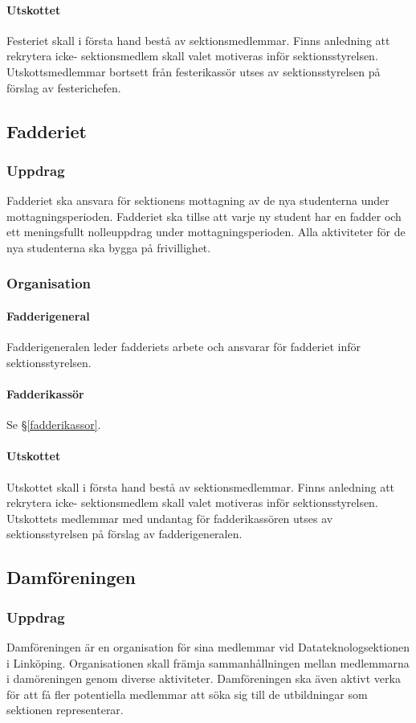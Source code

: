\documentclass{datateknologsektionen-document}
\begin{document}
\paragraph{Utskottet}
Festeriet skall i första hand bestå av sektionsmedlemmar. Finns anledning att rekrytera icke-
sektionsmedlem skall valet motiveras inför sektionsstyrelsen. Utskottsmedlemmar bortsett
från festerikassör utses av sektionsstyrelsen på förslag av festerichefen.
\subsection{Fadderiet}
\label{fadderiet}
\subsubsection{Uppdrag}
Fadderiet ska ansvara för sektionens mottagning av de nya studenterna under
mottagningsperioden. Fadderiet ska tillse att varje ny student har en fadder och ett meningsfullt
nolleuppdrag under mottagningsperioden. Alla aktiviteter för de nya studenterna ska bygga på
frivillighet.
\subsubsection{Organisation}
\paragraph{Fadderigeneral}
Fadderigeneralen leder fadderiets arbete och ansvarar för fadderiet inför sektionsstyrelsen.
\paragraph{Fadderikassör}
Se \S \ref{fadderikassor}.
\paragraph{Utskottet}

Utskottet skall i första hand bestå av sektionsmedlemmar. Finns anledning att rekrytera icke-
sektionsmedlem skall valet motiveras inför sektionsstyrelsen. Utskottets medlemmar med
undantag för fadderikassören utses av sektionsstyrelsen på förslag av fadderigeneralen.
\subsection{Damföreningen}
\label{damforeningen}
\subsubsection{Uppdrag}
Damföreningen är en organisation för sina medlemmar vid Datateknologsektionen i Linköping.
Organisationen skall främja sammanhållningen mellan medlemmarna i damöreningen genom
diverse aktiviteter. Damföreningen ska även aktivt verka för att få fler potentiella medlemmar
att söka sig till de utbildningar som sektionen representerar.
\end{document}
